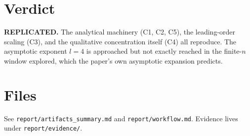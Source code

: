 \documentclass[11pt]{article}
\begin{document}
\section{Verdict}
\textbf{REPLICATED.} The analytical machinery (C1, C2, C5), the leading-order
scaling (C3), and the qualitative concentration itself (C4) all reproduce.
The asymptotic exponent $l=4$ is approached but not exactly reached in the
finite-$n$ window explored, which the paper's own asymptotic expansion
predicts.

\section*{Files}
See \texttt{report/artifacts\_summary.md} and \texttt{report/workflow.md}.
Evidence lives under \texttt{report/evidence/}.
\end{document}
